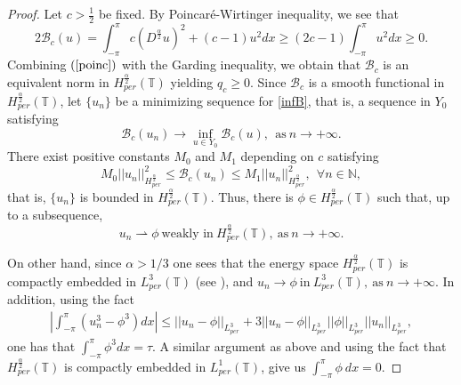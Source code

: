 \documentclass[12pt,reqno]{amsart}
\newcommand{\2}{L^2_{per}(0, T)}
\numberwithin{equation}{section}
\numberwithin{figure}{section}
\begin{document}
\begin{proof}
	Let $c>\frac{1}{2}$ be fixed. By Poincar\'e-Wirtinger inequality, we see that
\begin{equation}\label{poinc}\displaystyle 2\mathcal{B}_c(u) =\int_{-\pi}^{\pi}c(D^{\frac{\alpha}{2}}u)^2 + (c -1)u^2dx\geq (2c-1)\int_{-\pi}^{\pi}u^2dx\geq0.
\end{equation}	
Combining $(\ref{poinc})$ with the Garding inequality, we obtain that $\mathcal{B}_c$ is an equivalent norm in $H_{per}^{\frac{\alpha}{2}}(\mathbb{T})$ yielding
	$q_c \geq 0$. Since $\mathcal{B}_c$ is a smooth functional in $H_{per}^{\frac{\alpha}{2}}(\mathbb{T})$, let $\{u_n\}$ be a minimizing sequence for \eqref{infB}, that is, a sequence in $Y_{0}$ satisfying
	$$\displaystyle \mathcal{B}_c(u_n) \rightarrow \inf_{u \in 	Y_{0}}\mathcal{B}_c(u), \ \ \textrm{as} \ n \rightarrow +\infty.$$
	There exist positive constants $M_0$ and $M_1$ depending on $c$ satisfying
	$$M_0 ||u_n||_{H_{per}^{\frac{\alpha}{2}}}^2 \leq \mathcal{B}_c(u_n) \leq M_1 || u_n||_{H_{per}^{\frac{\alpha}{2}}}^2, \ \ \forall n \in \mathbb{N},$$
	that is, $\{u_n\}$ is bounded in $H_{per}^{\frac{\alpha}{2}}(\mathbb{T})$. Thus, there is $\phi \in H_{per}^{\frac{\alpha}{2}}(\mathbb{T})$ such that, up to a subsequence, $$u_n \rightharpoonup \phi \ \textrm{weakly in}  \ H_{per}^{\frac{\alpha}{2}}(\mathbb{T}), \ \textrm{as} \ n \rightarrow +\infty.$$
	
	On other hand, since $\alpha> 1/3$ one sees that the energy space $H_{per}^{\frac{\alpha}{2}}(\mathbb{T})$ is compactly embedded in $L_{per}^3(\mathbb{T})$ (see \cite[Theorem 4.2]{amb}), and
	$u_n \rightarrow \phi \ \textrm{in} \ L_{per}^3(\mathbb{T}), \ \textrm{as} \ n \rightarrow +\infty.$
	In addition, using the fact
	\begin{eqnarray*}
		\displaystyle \left|\int_{-\pi}^{\pi}(u_n^3 -\phi^3)dx \right|  \leq ||u_n - \phi ||_{L_{per}^3} + 3||u_n -\phi ||_{L_{per}^3}||\phi||_{L_{per}^3}|| u_n||_{L_{per}^3},
	\end{eqnarray*}
	one has that $\int_{-\pi}^{\pi}\phi^3 dx = \tau$. A similar argument as above and using the fact that
	$H_{per}^{\frac{\alpha}{2}}(\mathbb{T})$ is compactly embedded in $L_{per}^1(\mathbb{T})$, give us $\int_{-\pi}^{\pi} \phi \ dx = 0.$
	

\end{proof}
\end{document}
